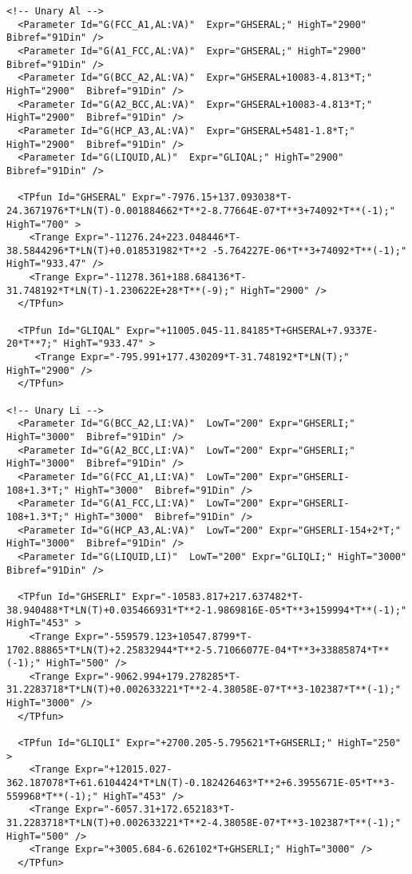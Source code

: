 \documentclass{article}
\begin{document}
\begin{appendices}
\begin{verbatim}
<!-- Unary Al -->
  <Parameter Id="G(FCC_A1,AL:VA)"  Expr="GHSERAL;" HighT="2900"  Bibref="91Din" />
  <Parameter Id="G(A1_FCC,AL:VA)"  Expr="GHSERAL;" HighT="2900"  Bibref="91Din" />
  <Parameter Id="G(BCC_A2,AL:VA)"  Expr="GHSERAL+10083-4.813*T;" HighT="2900"  Bibref="91Din" />
  <Parameter Id="G(A2_BCC,AL:VA)"  Expr="GHSERAL+10083-4.813*T;" HighT="2900"  Bibref="91Din" />
  <Parameter Id="G(HCP_A3,AL:VA)"  Expr="GHSERAL+5481-1.8*T;" HighT="2900"  Bibref="91Din" />
  <Parameter Id="G(LIQUID,AL)"  Expr="GLIQAL;" HighT="2900"  Bibref="91Din" />

  <TPfun Id="GHSERAL" Expr="-7976.15+137.093038*T-24.3671976*T*LN(T)-0.001884662*T**2-8.77664E-07*T**3+74092*T**(-1);" HighT="700" >
    <Trange Expr="-11276.24+223.048446*T-38.5844296*T*LN(T)+0.018531982*T**2 -5.764227E-06*T**3+74092*T**(-1);" HighT="933.47" /> 
    <Trange Expr="-11278.361+188.684136*T-31.748192*T*LN(T)-1.230622E+28*T**(-9);" HighT="2900" /> 
  </TPfun>

  <TPfun Id="GLIQAL" Expr="+11005.045-11.84185*T+GHSERAL+7.9337E-20*T**7;" HighT="933.47" >
     <Trange Expr="-795.991+177.430209*T-31.748192*T*LN(T);" HighT="2900" /> 
  </TPfun>

<!-- Unary Li -->
  <Parameter Id="G(BCC_A2,LI:VA)"  LowT="200" Expr="GHSERLI;" HighT="3000"  Bibref="91Din" />
  <Parameter Id="G(A2_BCC,LI:VA)"  LowT="200" Expr="GHSERLI;" HighT="3000"  Bibref="91Din" />
  <Parameter Id="G(FCC_A1,LI:VA)"  LowT="200" Expr="GHSERLI-108+1.3*T;" HighT="3000"  Bibref="91Din" />
  <Parameter Id="G(A1_FCC,LI:VA)"  LowT="200" Expr="GHSERLI-108+1.3*T;" HighT="3000"  Bibref="91Din" />
  <Parameter Id="G(HCP_A3,AL:VA)"  LowT="200" Expr="GHSERLI-154+2*T;" HighT="3000"  Bibref="91Din" />
  <Parameter Id="G(LIQUID,LI)"  LowT="200" Expr="GLIQLI;" HighT="3000"  Bibref="91Din" />

  <TPfun Id="GHSERLI" Expr="-10583.817+217.637482*T-38.940488*T*LN(T)+0.035466931*T**2-1.9869816E-05*T**3+159994*T**(-1);" HighT="453" >
    <Trange Expr="-559579.123+10547.8799*T-1702.88865*T*LN(T)+2.25832944*T**2-5.71066077E-04*T**3+33885874*T**(-1);" HighT="500" /> 
    <Trange Expr="-9062.994+179.278285*T-31.2283718*T*LN(T)+0.002633221*T**2-4.38058E-07*T**3-102387*T**(-1);" HighT="3000" /> 
  </TPfun>

  <TPfun Id="GLIQLI" Expr="+2700.205-5.795621*T+GHSERLI;" HighT="250" >
    <Trange Expr="+12015.027-362.187078*T+61.6104424*T*LN(T)-0.182426463*T**2+6.3955671E-05*T**3-559968*T**(-1);" HighT="453" /> 
    <Trange Expr="-6057.31+172.652183*T-31.2283718*T*LN(T)+0.002633221*T**2-4.38058E-07*T**3-102387*T**(-1);" HighT="500" /> 
    <Trange Expr="+3005.684-6.626102*T+GHSERLI;" HighT="3000" /> 
  </TPfun>


\end{verbatim}
\end{appendices}
\end{document}
